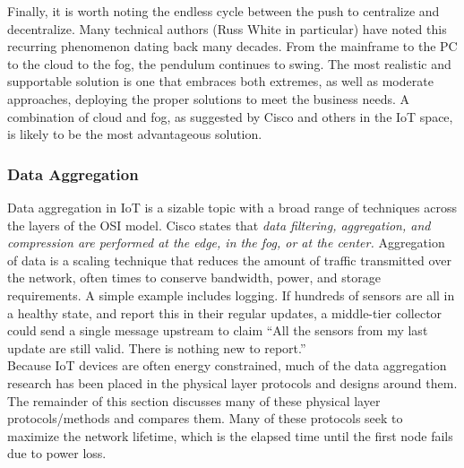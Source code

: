 Finally, it is worth noting the endless cycle between the push to centralize
and decentralize. Many technical authors (Russ White in particular) have noted
this recurring phenomenon dating back many decades. From the mainframe to the
PC to the cloud to the fog, the pendulum continues to swing. The most
realistic and supportable solution is one that embraces both extremes, as well
as moderate approaches, deploying the proper solutions to meet the business
needs. A combination of cloud and fog, as suggested by Cisco and others in the
IoT space, is likely to be the most advantageous solution.

\subsubsection{Data Aggregation}
Data aggregation in IoT is a sizable topic with a broad range of techniques
across the layers of the OSI model. Cisco states that \textit{data filtering,
aggregation, and compression are performed at the edge, in the fog, or at the
center.} Aggregation of data is a scaling technique that reduces the amount of
traffic transmitted over the network, often times to conserve bandwidth,
power, and storage requirements. A simple example includes logging. If
hundreds of sensors are all in a healthy state, and report this in their
regular updates, a middle-tier collector could send a single message upstream
to claim ``All the sensors from my last update are still valid. There is
nothing new to report.'' \\

Because IoT devices are often energy constrained, much of the data aggregation
research has been placed in the physical layer protocols and designs around
them. The remainder of this section discusses many of these physical layer
protocols/methods and compares them. Many of these protocols seek to maximize
the network lifetime, which is the elapsed time until the first node fails due
to power loss.

